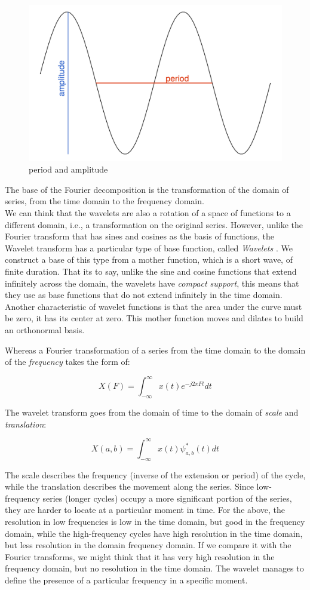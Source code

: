 \documentclass[a4paper]{article}
\begin{document}
	
	\begin{figure}[H]
		\centering
		\includegraphics[width=0.65\linewidth]{ciclo_en.png}
		\caption{period and amplitude} \label{fig:ciclo}
	\end{figure}
	
	The base of the Fourier decomposition is the transformation of the domain of series, from the time domain to the frequency domain.
	\\
	
	We can think that the wavelets are also a rotation of a space of functions to a different domain, i.e., a transformation on the original series. However, unlike the Fourier transform that has sines and cosines as the basis of functions, the Wavelet transform has a particular type of base function, called \textit{Wavelets} \cite{castro1995wavelets}. We construct a base of this type from a mother function, which is a short wave, of finite duration. That its to say, unlike the sine and cosine functions that extend infinitely across the domain, the wavelets have \textit{compact support}, this means that they use as base functions that do not extend infinitely in the time domain. Another characteristic of wavelet functions is that the area under the curve must be zero, it has its center at zero. This mother function moves and dilates to build an orthonormal basis.
	
	Whereas a Fourier transformation of a series from the time domain to the domain of the \textit{frequency} takes the form of:
	
	$$
	X(F)=\int_{-\infty}^{\infty} x(t) e^{-j2\pi Ft}dt
	$$
	
	The wavelet transform goes from the domain of time to the domain of \textit{scale} and \textit{translation}:
	
	$$
	X(a,b)=\int_{-\infty}^{\infty} x(t) \psi^*_{a,b}(t)dt
	$$
	
	The scale describes the frequency (inverse of the extension or period) of the cycle, while the translation describes the movement along the series. Since low-frequency series (longer cycles) occupy a more significant portion of the series, they are harder to locate at a particular moment in time. For the above, the resolution in low frequencies is low in the time domain, but good in the frequency domain, while the high-frequency cycles have high resolution in the time domain, but less resolution in the domain frequency domain. If we compare it with the Fourier transforms, we might think that it has very high resolution in the frequency domain, but no resolution in the time domain. The wavelet manages to define the presence of a particular frequency in a specific moment.
	
\end{document}
